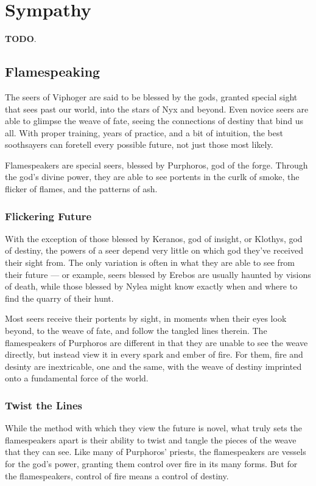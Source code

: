 \section{Sympathy} \label{sec::sympathy}
\textbf{TODO}.

\subsection*{Flamespeaking} \label{ssec::flamespeaking}

    The seers of Viphoger are said to be blessed by the gods, granted special sight that sees past our world, into the stars of Nyx and beyond.
    Even novice seers are able to glimpse the weave of fate, seeing the connections of destiny that bind us all.
    With proper training, years of practice, and a bit of intuition, the best soothsayers can foretell every possible future, not just those most likely.

    Flamespeakers are special seers, blessed by Purphoros, god of the forge.
    Through the god's divine power, they are able to see portents in the curlk of smoke, the flicker of flames, and the patterns of ash.

    \subsubsection{Flickering Future}
        With the exception of those blessed by Keranos, god of insight, or Klothys, god of destiny, the powers of a seer depend very little on which god they've received their sight from.
        The only variation is often in what they are able to see from their future --- or example, seers blessed by Erebos are usually haunted by visions of death, while those blessed by Nylea might know exactly when and where to find the quarry of their hunt.

        Most seers receive their portents by sight, in moments when their eyes look beyond, to the weave of fate, and follow the tangled lines therein.
        The flamespeakers of Purphoros are different in that they are unable to see the weave directly, but instead view it in every spark and ember of fire.
        For them, fire and desinty are inextricable, one and the same, with the weave of destiny imprinted onto a fundamental force of the world.

    \subsubsection{Twist the Lines}
        While the method with which they view the future is novel, what truly sets the flamespeakers apart is their ability to twist and tangle the pieces of the weave that they can see.
        Like many of Purphoros' priests, the flamespeakers are vessels for the god's power, granting them control over fire in its many forms.
        But for the flamespeakers, control of fire means a control of destiny.

